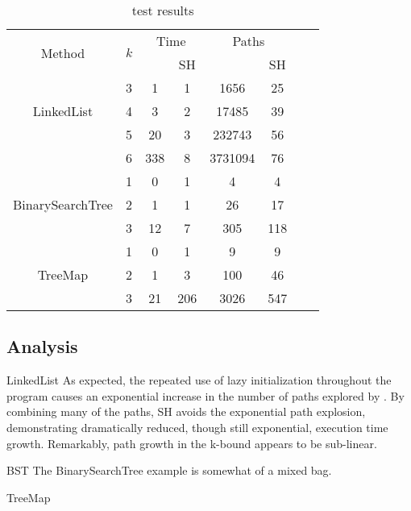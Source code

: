 \begin{table} [h]
  \centering
  \begin{tabular}{| c | c | c | c | c | c | c | c |}
  \hline
   \multirow{2}{*}{Method }&\multirow{2}{*}{ $k$ }
   &\multicolumn{2}{|c|}{Time} &\multicolumn{2}{|c|}{ Paths }\\
								&	&\gsetxt{}	&SH	&\gsetxt{} & SH\\
   \hline
    \multirow{3}{*}{LinkedList }&3	& 1 & 1  &1656 & 25		 \\
   		 				& 4	& 3 & 2	&17485  & 39 \\
   						& 5	& 20 & 3	&232743 & 56\\
						& 6	& 338 & 8		&3731094 & 76\\
    \hline
    \multirow{3}{*}{BinarySearchTree }&1	& 0 & 1	& 4	 & 4\\
   		 				& 2	& 1 & 1 	& 26 & 17\\
   						& 3	& 12 & 7	& 305 & 118\\
    \hline
      \multirow{3}{*}{TreeMap}&1	& 0 & 1 	&9 & 9 \\
   		 				&2	& 1 & 3		& 100 & 46 \\
   						&3	&21 & 206	& 3026 & 547 \\
						
    \hline
  \end{tabular}
  \caption{test results}
  \label{tab:results}
\end{table}

\subsection{Analysis}

LinkedList
As expected, the repeated use of lazy initialization throughout the program causes an exponential increase in the number of paths explored by \gsetxt{}. By combining many of the \gsetxt{} paths, SH avoids the exponential path explosion, demonstrating dramatically reduced, though still exponential, execution time growth. Remarkably, path growth in the k-bound appears to be sub-linear.

BST
The BinarySearchTree example is somewhat of a mixed bag. 

TreeMap

